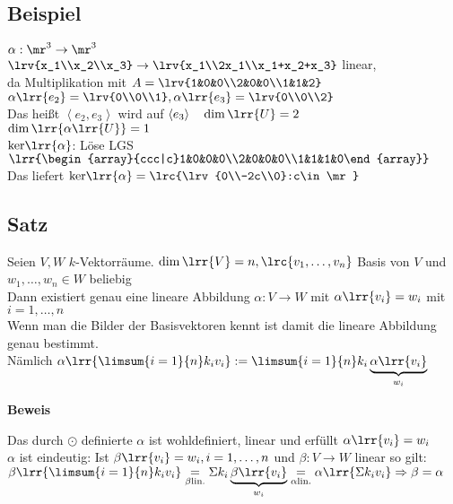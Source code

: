 \subsection{Beispiel}
	$\alpha:\mr^3\rightarrow\mr^3$\\
	$\lrv{x_1\\x_2\\x_3}\rightarrow\lrv{x_1\\2x_1\\x_1+x_2+x_3}$ linear,\\
	da Multiplikation mit $A=\lrv{1&0&0\\2&0&0\\1&1&2}$\\
	$\alpha\lrr{e_2}=\lrv{0\\0\\1}, \alpha\lrr{e_3}=\lrv{0\\0\\2}$\\
	Das heißt $\left\langle e_2,e_3\right\rangle$ wird auf $\left\langle e_3\right\rangle\quad\dim\lrr{U}=2$\\
	$\dim\lrr{\alpha\lrr{U}}=1$\\
	$\mbox{ker}\lrr{\alpha}$: Löse LGS $\lrr{\begin{array}{ccc|c}1&0&0&0\\2&0&0&0\\1&1&1&0\end{array}}$\\
	Das liefert $\mbox{ker}\lrr{\alpha}=\lrc{\lrv{0\\-2c\\0}:c\in\mr}$
	
\subsection{Satz}
	Seien $V,W$ $k$-Vektorräume. $\dim\lrr{V}=n, \lrc{v_1,\dots,v_n}$ Basis von $V$ und $w_1,\dots,w_n\in W$ beliebig\\
	Dann existiert genau eine lineare Abbildung $\alpha:V\rightarrow W$ mit $\alpha\lrr{v_i}=w_i$ mit $i=1,\dots,n$\\
	Wenn man die Bilder der Basisvektoren kennt ist damit die lineare Abbildung genau bestimmt.\\
	Nämlich $\alpha\lrr{\limsum{i=1}{n}k_iv_i}:=\limsum{i=1}{n}k_i\underbrace{\alpha\lrr{v_i}}_{\scriptstyle w_i}$
	
	\textbf{Beweis}
	
	Das durch $\odot$ definierte $\alpha$ ist wohldefiniert, linear und erfüllt $\alpha\lrr{v_i}=w_i$\\
	$\alpha$ ist eindeutig: Ist $\beta\lrr{v_i}=w_i, i=1,\dots, n$ und $\beta: V\rightarrow W$ linear so gilt:\\
	$\beta\lrr{\limsum{i=1}{n}k_iv_i}\underset{\scriptstyle\beta\mbox{\scriptsize  lin.}}{=}\Sigma k_i\underbrace{\beta\lrr{v_i}}_{\scriptstyle w_i}\underset{\scriptstyle\alpha\mbox{\scriptsize  lin.}}{=}\alpha\lrr{\Sigma k_iv_i}\Rightarrow\beta=\alpha$
	

